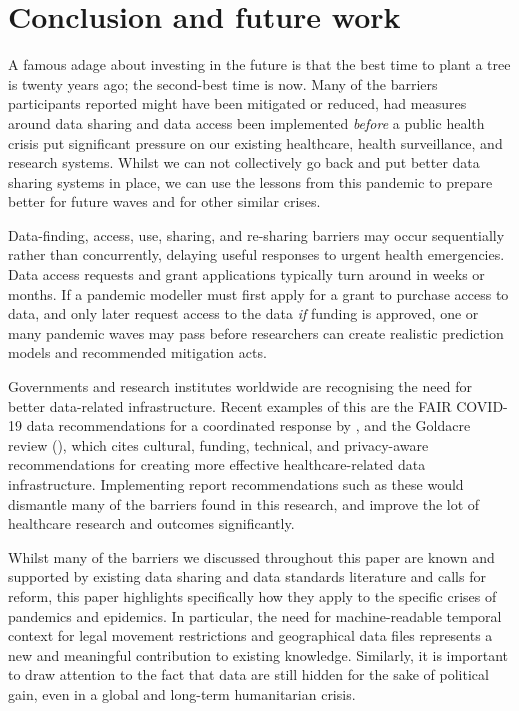 \documentclass{CUP-JNL-DAP}%
\begin{document}
\section{Conclusion and future work}
A famous adage about investing in the future is that the best time to plant a tree is twenty years ago; the second-best time is now. Many of the barriers participants reported might have been mitigated or reduced, had measures around data sharing and data access been implemented \textit{before} a public health crisis put significant pressure on our existing healthcare, health surveillance, and research systems. Whilst we can not collectively go back and put better data sharing systems in place, we can use the lessons from this pandemic to prepare better for future waves and for other similar crises. 

Data-finding, access, use, sharing, and re-sharing barriers may occur sequentially rather than concurrently, delaying useful responses to urgent health emergencies. Data access requests and grant applications typically turn around in weeks or months. If a pandemic modeller must first apply for a grant to purchase access to data, and only later request access to the data \textit{if} funding is approved, one or many pandemic waves may pass before researchers can create realistic prediction models and recommended mitigation acts. 

Governments and research institutes worldwide are recognising the need for better data-related infrastructure. Recent examples of this are the FAIR COVID-19 data recommendations for a coordinated response by \cite{FAIR_data_for_a_coordinated_COVID-19_response},  and the Goldacre review (\cite{goldacre_review}), which cites cultural, funding, technical, and privacy-aware recommendations for creating more effective healthcare-related data infrastructure. Implementing report recommendations such as these would dismantle many of the barriers found in this research, and improve the lot of healthcare research and outcomes significantly.

Whilst many of the barriers we discussed throughout this paper are known and supported by existing data sharing and data standards literature and calls for reform, this paper highlights specifically how they apply to the specific crises of pandemics and epidemics. In particular, the need for machine-readable temporal context for legal movement restrictions and geographical data files represents a new and meaningful contribution to existing knowledge. Similarly, it is important to draw attention to the fact that data are still hidden for the sake of political gain, even in a global and long-term humanitarian crisis. 
\end{document}
